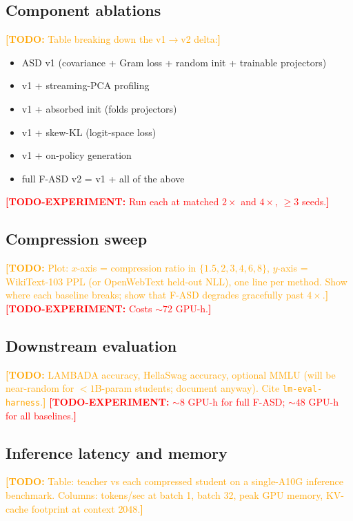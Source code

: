 \documentclass{article}
\newcommand{\todo}[1]{\textcolor{orange}{\textbf{[TODO:} #1\textbf{]}}}
\newcommand{\todoexp}[1]{\textcolor{red}{\textbf{[TODO-EXPERIMENT:} #1\textbf{]}}}
\newcommand{\fasd}{\texorpdfstring{\textsc{F-ASD}}{F-ASD}}
\begin{document}
\subsection{Component ablations}
\label{sec:exp:ablations}
\todo{Table breaking down the v1$\to$v2 delta:}
\begin{itemize}[leftmargin=*,nosep]
  \item ASD v1 (covariance + Gram loss + random init + trainable projectors)
  \item v1 + streaming-PCA profiling
  \item v1 + absorbed init (folds projectors)
  \item v1 + skew-KL (logit-space loss)
  \item v1 + on-policy generation
  \item full \fasd{} v2 = v1 + all of the above
\end{itemize}
\todoexp{Run each at matched $2\times$ and $4\times$, $\geq 3$ seeds.}

\subsection{Compression sweep}
\label{sec:exp:compression}
\todo{Plot: $x$-axis = compression ratio in $\{1.5, 2, 3, 4, 6, 8\}$,
$y$-axis = WikiText-103 PPL (or OpenWebText held-out NLL), one line per
method. Show where each baseline breaks; show that \fasd{} degrades gracefully
past $4\times$.} \todoexp{Costs $\sim$$72$ GPU-h.}

\subsection{Downstream evaluation}
\label{sec:exp:downstream}
\todo{LAMBADA accuracy, HellaSwag accuracy, optional MMLU (will be near-random
for $<1$B-param students; document anyway). Cite \texttt{lm-eval-harness}.}
\todoexp{$\sim$$8$ GPU-h for full \fasd{}; $\sim$$48$ GPU-h for all baselines.}

\subsection{Inference latency and memory}
\label{sec:exp:latency}
\todo{Table: teacher vs each compressed student on a single-A10G inference
benchmark. Columns: tokens/sec at batch 1, batch 32, peak GPU memory,
$\mathrm{KV}$-cache footprint at context $2048$.}

\end{document}
